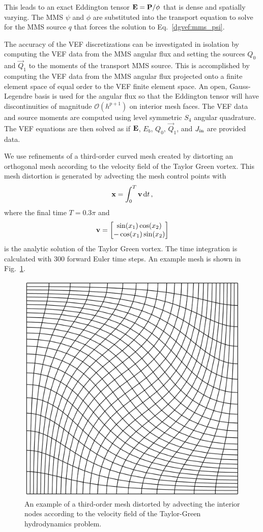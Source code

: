 \documentclass[../doc.tex]{subfiles}
\begin{document}
This leads to an exact Eddington tensor $\boldsymbol{\mathrm{E}} = \boldsymbol{\mathrm{P}}/\phi$ that is dense and spatially varying. The MMS $\psi$ and $\phi$ are substituted into the transport equation to solve for the MMS source $q$ that forces the solution to Eq.~\ref{dgvef:mms_psi}. 

The accuracy of the VEF discretizations can be investigated in isolation by computing the VEF data from the MMS angular flux and setting the sources $Q_0$ and $\vec{Q}_1$ to the moments of the transport MMS source. This is accomplished by computing the VEF data from the MMS angular flux projected onto a finite element space of equal order to the VEF finite element space. An open, Gauss-Legendre basis is used for the angular flux so that the Eddington tensor will have discontinuities of magnitude $\mathcal{O}(h^{p+1})$ on interior mesh faces. The VEF data and source moments are computed using level symmetric $S_4$ angular quadrature. The VEF equations are then solved as if $\boldsymbol{\mathrm{E}}$, $E_b$, $Q_0$, $\vec{Q}_1$, and $J_\text{in}$ are provided data. 

We use refinements of a third-order curved mesh created by distorting an orthogonal mesh according to the velocity field of the Taylor Green vortex. This mesh distortion is generated by advecting the mesh control points with 
	\begin{equation}
		\boldsymbol{\mathrm{x}} = \int_0^T \boldsymbol{\mathrm{v}} \mathop{}\!\mathrm{d} t \,,
	\end{equation}
where the final time $T = 0.3 \pi$ and 
	\begin{equation}
		\boldsymbol{\mathrm{v}} = \begin{bmatrix} 
			\sin(x_1) \cos(x_2) \\
			-\cos(x_1)\sin(x_2) 
		\end{bmatrix}
	\end{equation}
is the analytic solution of the Taylor Green vortex. The time integration is calculated with 300 forward Euler time steps. An example mesh is shown in Fig.~\ref{dgvef:tgmesh}. 

\begin{figure}
\centering
\includegraphics[width=.5\textwidth]{data/img/tgmesh0.3.png}
\caption{An example of a third-order mesh distorted by advecting the interior nodes according to the velocity field of the Taylor-Green hydrodynamics problem. }
\label{dgvef:tgmesh}
\end{figure}
\end{document}

